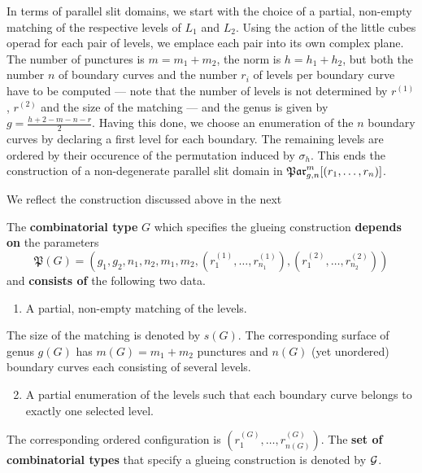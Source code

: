 In terms of parallel slit domains, we start with the choice of a partial, non-empty matching of the respective levels of $L_1$ and $L_2$.
Using the action of the little cubes operad for each pair of levels, we emplace each pair into its own complex plane.
The number of punctures is $m = m_1 + m_2$, the norm is $h = h_1 + h_2$, but both the number $n$ of boundary curves and the number $r_i$ of levels per boundary curve have to be computed
--- note that the number of levels is not determined by $r^{(1)}$, $r^{(2)}$ and the size of the matching ---
and the genus is given by $g = \frac{h+2-m-n-r}{2}$.
Having this done, we choose an enumeration of the $n$ boundary curves by declaring a first level for each boundary.
The remaining levels are ordered by their occurence of the permutation induced by $\sigma_{h}$.
This ends the construction of a non-degenerate parallel slit domain in $\Par_{g,n}^m[(r_1, \ldots, r_n)]$.

We reflect the construction discussed above in the next
\begin{defi}
    The {\bfseries combinatorial type} $G$ which specifies the glueing construction {\bfseries depends on} the parameters
    \[
        \mathfrak P(G) = (g_1, g_2, n_1, n_2, m_1, m_2, (r_1^{(1)}, \ldots, r_{n_1}^{(1)}), (r_1^{(2)}, \ldots, r_{n_2}^{(2)}))
    \]
    and {\bfseries consists of} the following two data.
    \begin{enumerate}
        \item A partial, non-empty matching of the levels.
    \end{enumerate}
    The size of the matching is denoted by $s(G)$.
    The corresponding surface of genus $g(G)$ has $m(G) = m_1 + m_2$ punctures and $n(G)$ (yet unordered) boundary curves each consisting of several levels.
    \begin{enumerate}
        \setcounter{enumi}{1}
        \item A partial enumeration of the levels such that each boundary curve belongs to exactly one selected level.
    \end{enumerate}
    The corresponding ordered configuration is $(r^{(G)}_1, \ldots, r^{(G)}_{n(G)})$.
    The {\bfseries set of combinatorial types} that specify a glueing construction is denoted by $\mathcal{G}$.
\end{defi}

